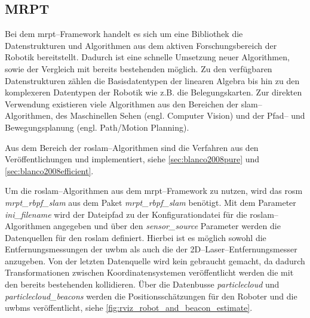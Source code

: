 \begin{comment}
--------------------------------------------------------------------------------
- \url{https://www.mrpt.org}
- \url{http://wiki.ros.org/mrpt_slam}
- \url{http://wiki.ros.org/mrpt_navigation}
- \url{https://www.mrpt.org/tutorials/slam-algorithms/rangeonly_slam/}
	- Bayesian range-only SLAM (RO-SLAM) with SOGs
- \url{http://mrpt.ual.es/reference/devel/classmrpt_1_1slam_1_1_c_metric_map_builder_r_b_p_f.html}
	-mrpt::slam::CMetricMapBuilderRBPF Class Reference
	- It is actually a front-end to the class mrpt::slam::CMetricMapBuilderRBPF. All the parameters to the algorithm are passed through a configuration file in the command line. The filter processes actions and observations from a rawlog file and optionally generates a number of files describing the evolution of the filter and the maps.
\end{comment}
\subsection{MRPT}

Bei dem \Gls{mrpt}--Framework handelt es sich um eine Bibliothek die Datenstrukturen und Algorithmen aus dem aktiven Forschungsbereich der Robotik bereitstellt. Dadurch ist eine schnelle Umsetzung neuer Algorithmen, sowie der Vergleich mit bereits bestehenden möglich. Zu den verfügbaren Datenstrukturen zählen die Basisdatentypen der linearen Algebra bis hin zu den komplexeren Datentypen der Robotik wie z.B. die Belegungskarten. Zur direkten Verwendung existieren viele Algorithmen aus den Bereichen der \Gls{slam}--Algorithmen, des Maschinellen Sehen (engl. Computer Vision) und der Pfad-- und Bewegungsplanung (engl. Path/Motion Planning).

Aus dem Bereich der \Gls{roslam}--Algorithmen sind die Verfahren aus den Veröffentlichungen  und  implementiert, siehe \autoref{sec:blanco2008pure} und \ref{sec:blanco2008efficient}.

Um die \Gls{roslam}--Algorithmen aus dem \Gls{mrpt}--Framework zu nutzen, wird das \Gls{rosm} \textit{mrpt\_rbpf\_slam} aus dem Paket \textit{mrpt\_rbpf\_slam} benötigt. Mit dem Parameter \textit{ini\_filename} wird der Dateipfad zu der Konfigurationdatei für die \Gls{roslam}--Algorithmen angegeben und über den \textit{sensor\_source} Parameter werden die Datenquellen für den \Gls{roslam} definiert. Hierbei ist es möglich sowohl die Entfernungsmessungen der \Gls{uwbm} als auch die der 2D--Laser--Entfernungsmesser anzugeben. Von der letzten Datenquelle wird kein gebraucht gemacht, da dadurch Transformationen zwischen Koordinatensystemen veröffentlicht werden die mit den bereits bestehenden kollidieren. Über die Datenbusse \textit{particlecloud} und \textit{particlecloud\_beacons} werden die Positionsschätzungen für den Roboter und die \Glspl{uwbm} veröffentlicht, siehe \autoref{fig:rviz_robot_and_beacon_estimate}.

